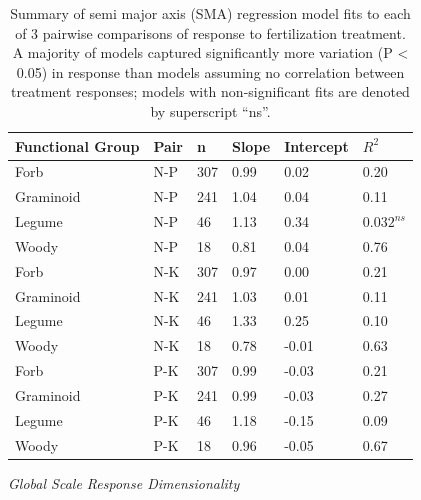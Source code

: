 \documentclass[twoside,12pt,final]{ucthesis-CA2012}
\begin{document}
\begin{ucmainmatter}
\begin{figure}
\end{figure}
\begin{table}[ht]
\centering
\begin{tabular}{llllll}
 Functional Group & Pair & n & Slope & Intercept & $R^2$ \\ 
  \hline
Forb & N-P & 307 & 0.99 & 0.02 & 0.20 \\ 
  Graminoid & N-P & 241 & 1.04 & 0.04 & 0.11 \\ 
  Legume & N-P & 46 & 1.13 & 0.34 & $0.032^{ns}$ \\ 
  Woody & N-P & 18 & 0.81 & 0.04 & 0.76 \\ 
   \hline
Forb & N-K & 307 & 0.97 & 0.00 & 0.21 \\ 
  Graminoid & N-K & 241 & 1.03 & 0.01 & 0.11 \\ 
  Legume & N-K & 46 & 1.33 & 0.25 & 0.10 \\ 
  Woody & N-K & 18 & 0.78 & -0.01 & 0.63 \\ 
   \hline
Forb & P-K & 307 & 0.99 & -0.03 & 0.21 \\ 
  Graminoid & P-K & 241 & 0.99 & -0.03 & 0.27 \\ 
  Legume & P-K & 46 & 1.18 & -0.15 & 0.09 \\ 
  Woody & P-K & 18 & 0.96 & -0.05 & 0.67 \\ 
  \end{tabular}
\caption{Summary of semi major axis (SMA) regression model fits to each of 3 pairwise comparisons of response to fertilization treatment. A majority of models captured significantly more variation (P < 0.05) in response than models assuming no correlation between treatment responses; models with non-significant fits are denoted by superscript “ns”.} 
\end{table}
\newline

\emph{Global Scale Response Dimensionality}


\end{ucmainmatter}
\end{document}
